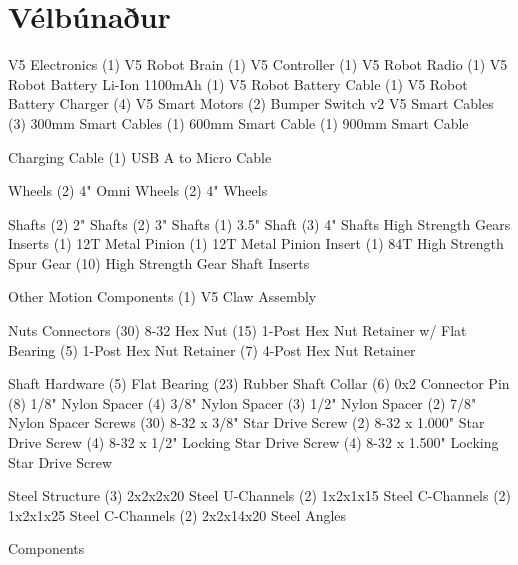 \section{Vélbúnaður}
V5 Electronics
(1) V5 Robot Brain
(1) V5 Controller
(1) V5 Robot Radio
(1) V5 Robot Battery Li-Ion 1100mAh
(1) V5 Robot Battery Cable
(1) V5 Robot Battery Charger
(4) V5 Smart Motors
(2) Bumper Switch v2
V5 Smart Cables
(3) 300mm Smart Cables
(1) 600mm Smart Cable
(1) 900mm Smart Cable

Charging Cable
(1) USB A to Micro Cable

Wheels
(2) 4" Omni Wheels
(2) 4" Wheels

Shafts
(2) 2" Shafts
(2) 3" Shafts
(1) 3.5" Shaft
(3) 4" Shafts
High Strength Gears  Inserts
(1) 12T Metal Pinion
(1) 12T Metal Pinion Insert
(1) 84T High Strength Spur Gear
(10) High Strength Gear Shaft Inserts

Other Motion Components
(1) V5 Claw Assembly

Nuts  Connectors
(30) 8-32 Hex Nut
(15) 1-Post Hex Nut Retainer w/ Flat Bearing
(5) 1-Post Hex Nut Retainer
(7) 4-Post Hex Nut Retainer

Shaft Hardware
(5) Flat Bearing
(23) Rubber Shaft Collar
(6) 0x2 Connector Pin
(8) 1/8" Nylon Spacer
(4) 3/8" Nylon Spacer
(3) 1/2" Nylon Spacer
(2) 7/8" Nylon Spacer
Screws
(30) 8-32 x 3/8" Star Drive Screw
(2) 8-32 x 1.000" Star Drive Screw
(4) 8-32 x 1/2" Locking Star Drive Screw
(4) 8-32 x 1.500" Locking Star Drive Screw

Steel Structure
(3) 2x2x2x20 Steel U-Channels
(2) 1x2x1x15 Steel C-Channels
(2) 1x2x1x25 Steel C-Channels
(2) 2x2x14x20 Steel Angles

Components \cite{vexRobothardware}

\begin{center}
\begin{tabular}{ |c|c|c| } 

\end{tabular}
\end{center}
